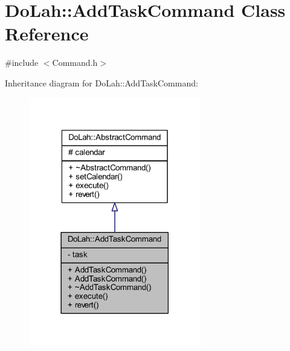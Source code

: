 \hypertarget{class_do_lah_1_1_add_task_command}{}\section{Do\+Lah\+:\+:Add\+Task\+Command Class Reference}
\label{class_do_lah_1_1_add_task_command}


{\ttfamily \#include $<$Command.\+h$>$}



Inheritance diagram for Do\+Lah\+:\+:Add\+Task\+Command\+:\nopagebreak
\begin{figure}[H]
\begin{center}
\leavevmode
\includegraphics[width=213pt]{class_do_lah_1_1_add_task_command__inherit__graph}
\end{center}
\end{figure}


